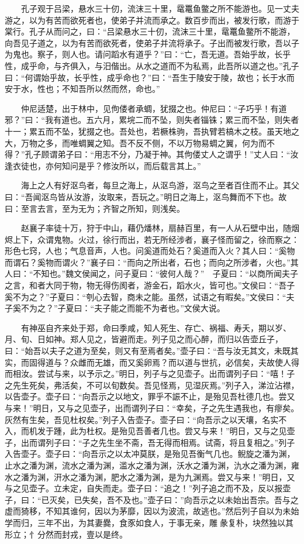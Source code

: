 　　孔子观于吕梁，悬水三十仞，流沫三十里，鼋鼍鱼鳖之所不能游也。见一丈夫游之，以为有苦而欲死者也，使弟子并流而承之。数百步而出，被发行歌，而游于棠行。孔子从而问之，曰：``吕梁悬水三十仞，流沫三十里，鼋鼍鱼鳖所不能游，向吾见子道之，以为有苦而欲死者，使弟子并流将承子。子出而被发行歌，吾以子为鬼也。察子，则人也。请问蹈水有道乎？''曰：``亡，吾无道。吾始乎故，长乎性，成乎命，与齐俱入，与汨偕出。从水之道而不为私焉，此吾所以道之也。''孔子曰：``何谓始乎故，长乎性，成乎命也？''曰：``吾生于陵安于陵，故也；长于水而安于水，性也；不知吾所以然而然，命也。''

　　仲尼适楚，出于林中，见佝偻者承蜩，犹掇之也。仲尼曰：``子巧乎！有道邪？''曰：``我有道也。五六月，累垸二而不坠，则失者锱铢；累三而不坠，则失者十一；累五而不坠，犹掇之也。吾处也，若橛株驹，吾执臂若槁木之枝。虽天地之大，万物之多，而唯蜩翼之知。吾不反不侧，不以万物易蜩之翼，何为而不得？''孔子顾谓弟子曰：``用志不分，乃凝于神。其佝偻丈人之谓乎！''丈人曰：``汝逢衣徒也，亦何知问是乎？修汝所以，而后载言其上。''

　　海上之人有好沤鸟者，每旦之海上，从沤鸟游，沤鸟之至者百住而不止。其父曰：``吾闻沤鸟皆从汝游，汝取来，吾玩之。''明日之海上，沤鸟舞而不下也。故曰：至言去言，至为无为；齐智之所知，则浅矣。

　　赵襄子率徒十万，狩于中山，藉仍燔林，扇赫百里，有一人从石壁中出，随烟烬上下，众谓鬼物。火过，徐行而出，若无所经涉者，襄子怪而留之，徐而察之：形色七窍，人也；气息音声，人也。问奚道而处石？奚道而入火？其人曰：``奚物而谓石？奚物而谓火？''襄子曰：``而向之所出者，石也；而向之所涉者，火也。''其人曰：``不知也。''魏文侯闻之，问子夏曰：``彼何人哉？''　子夏曰：``以商所闻夫子之言，和者大同于物，物无得伤阂者，游金石，蹈水火，皆可也。''文侯曰：``吾子奚不为之？''子夏曰：``刳心去智，商未之能。虽然，试语之有暇矣。''文侯曰：``夫子奚不为之？''子夏曰：``夫子能之而能不为者也。''文侯大说。

　　有神巫自齐来处于郑，命曰季咸，知人死生、存亡、祸福、寿夭，期以岁、月、旬、日如神。郑人见之，皆避而走。列子见之而心醉，而归以告壶丘子，曰：``始吾以夫子之道为至矣，则又有至焉者矣。''壶子曰：``吾与汝无其文，未既其实，而固得道与？众雌而无雄，而又奚卵焉？而以道与世抗，必信矣，夫故使人得而相汝。尝试与来，以予示之。''明日，列子与之见壶子。出而谓列子曰：``嘻！子之先生死矣，弗活矣，不可以旬数矣。吾见怪焉，见湿灰焉。''列子入，涕泣沾襟，以告壶子。壶子曰：``向吾示之以地文，罪乎不誫不止，是殆见吾杜德几也。尝又与来！''明日，又与之见壶子，出而谓列子曰：``幸矣，子之先生遇我也，有瘳矣。灰然有生矣，吾见杜权矣。''列子入告壶子。壶子曰：``向吾示之以天壤，名实不入，而机发于踵，此为杜权。是殆见吾善者几也。尝又与来！''明日，又与之见壶子，出而谓列子曰：``子之先生坐不斋，吾无得而相焉。试斋，将且复相之。''列子入告壶子。壶子曰：``向吾示之以太冲莫朕，是殆见吾衡气几也。鲵旋之潘为渊，止水之潘为渊，流水之潘为渊，滥水之潘为渊，沃水之潘为渊，氿水之潘为渊，雍水之潘为渊，汧水之潘为渊，肥水之潘为渊，是为九渊焉。尝又与来！''明日，又与之见壶子。立未定，自失而走。壶子曰：``追之！''列子追之而不及，反以报壶子，曰：``已灭矣，已失矣，吾不及也。''壶子曰：''向吾示之以未始出吾宗。吾与之虚而猗移，不知其谁何，因以为茅靡，因以为波流，故逃也。''然后列子自以为未始学而归，三年不出，为其妻爨，食豕如食人，于事无亲，雕彖复朴，块然独以其形立；忄分然而封戎，壹以是终。


